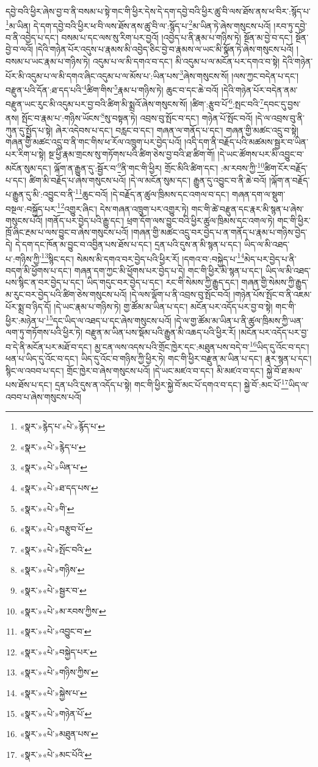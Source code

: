 དབྱེ་བའི་ཕྱིར་ཞེས་བྱ་བ་ནི་བསམ་པ་སྟེ་གང་གི་ཕྱིར་དེས་དེ་དག་དབྱེ་བའི་ཕྱིར་ཚུ་བི་ལས་ཐོས་ནས་ཕ་བིར་:སྙོད་པ་\footnote{«སྣར་»རྙེད་པ་«པེ་»རྙོད་པ་}མ་ཡིན། དེ་དག་དབྱེ་བའི་ཕྱིར་ཕ་བི་ལས་ཐོས་ནས་ཚུ་བི་ལ་:སྙོད་པ་\footnote{«སྣར་»«པེ་»རྙེད་པ་}མ་ཡིན་ཏེ་ཞེས་གསུངས་པའོ། །རབ་ཏུ་དབྱེ་བ་ནི་འབྱེད་པ་དང་། བསམ་པ་དང་ལས་སུ་རིག་པར་བྱའོ། །འབྱེད་པ་ནི་རྣམ་པ་གཉིས་ཏེ། སྔོན་མ་བྱེ་བ་དང་། སྔོན་བྱེ་བ་ལའོ། །དེའི་གཉེན་པོར་འདུས་པ་རྣམས་མི་འབྱེད་ཅིང་བྱེ་བ་རྣམས་ལ་ཡང་མི་སྣོན་ཏེ་ཞེས་གསུངས་པའོ། །བསམ་པ་ཡང་རྣམ་པ་གཉིས་ཏེ། འདུམ་པ་ལ་མི་དགའ་བ་དང་། མི་འདུམ་པ་ལ་མངོན་པར་དགའ་བ་སྟེ། དེའི་གཉེན་པོར་མི་འདུམ་པ་ལ་མི་དགའ་ཞིང་འདུམ་པ་ལ་མོས་པ་:ཡིན་པས་\footnote{«སྣར་»«པེ་»ཡིན་པ་}ཞེས་གསུངས་སོ། །ལས་ཀྱང་བདེན་པ་དང་། བརྫུན་པའི་དོན་:ཐ་དད་པའི་\footnote{«སྣར་»«པེ་»ཐ་དད་པས་}ཚིག་གིས་\footnote{«སྣར་»«པེ་»གི་}རྣམ་པ་གཉིས་ཏེ། ཆུང་བ་དང་ཆེ་བའོ། །དེའི་གཉེན་པོར་བདེན་ནམ་བརྫུན་ཡང་རུང་མི་འདུམ་པར་བྱ་བའི་ཚིག་མི་སྨྲའོ་ཞེས་གསུངས་སོ། །ཚིག་:རྩུབ་པོ་\footnote{«སྣར་»«པེ་»བརྩུབ་པོ་}:སྤང་བའི་\footnote{«སྣར་»«པེ་»སྤོང་བའི་}དབང་དུ་བྱས་ནས། སྤོང་བ་རྣམ་པ་:གཉིས་ཡོངས་\footnote{«སྣར་»«པེ་»གཉིས་}སུ་བསྟན་ཏེ། འབྲས་བུ་སྤོང་བ་དང་། གཉེན་པོ་སྤོང་བའོ། །དེ་ལ་འབྲས་བུ་ནི་ཀུན་དུ་སྤྱོད་པ་སྟེ། ཞེར་འདེབས་པ་དང་། བརླང་བ་དང་། གཞན་ལ་གནོད་པ་དང་། གཞན་གྱི་མཚང་འདྲུ་བ་སྟེ། གཞན་གྱི་མཚང་འདྲུ་བ་ནི་གང་གིས་ཕ་རོལ་འཁྲུག་པར་བྱེད་པའོ། །འདི་དག་ནི་བརྗོད་པའི་མཚམས་སྦྱར་བ་ཡིན་པར་རིག་པ་སྟེ། སྔ་ཕྱི་རྣམ་གྲངས་སུ་གཏོགས་པའི་ཚིག་ཅེས་བྱ་བའི་ཐ་ཚིག་གོ། །དེ་ཡང་ཚོགས་པར་མི་འབྱུང་བ་མངོན་སུམ་དང་། ལྐོག་ན་རྒྱུན་དུ་:སྦྱོར་བ་\footnote{«སྣར་»«པེ་»སྦྱར་བ་}ནི་གང་གི་ཕྱིར། གྲོང་མིའི་ཚིག་དང་། :མ་རབས་ཀྱི་\footnote{«སྣར་»«པེ་»མ་རབས་ཀྱིས་}ཚིག་ངོར་བརྗོད་པ་དང་། ཚིག་མི་བརྗོད་པ་ཞེས་གསུངས་པའོ། །དེ་ལ་མངོན་སུམ་དང་། རྒྱུན་དུ་འབྱུང་བ་ནི་ཆེ་བའོ། །ལྐོག་ན་བརྗོད་པ་རྒྱུན་དུ་མི་:འབྱུང་བ་ནི་\footnote{«སྣར་»«པེ་»འབྱུང་བ་}ཆུང་བའོ། །དེ་བརྗོད་ན་ཚུལ་ཁྲིམས་དང་འགལ་བ་དང་། གཞན་དག་ལ་སྡུག་བསྔལ་:བསྐྱོད་པར་\footnote{«སྣར་»«པེ་»བསྐྱེད་པར་}འགྱུར་ཞིང་། དེས་གཞན་འཁྲུག་པར་འགྱུར་ཏེ། གང་གི་ཚེ་བརྫུན་དང་རྣར་མི་སྙན་པ་ཞེས་གསུངས་པའོ། །གནོད་པར་བྱེད་པའི་རྒྱུ་དང་། ཕྲག་དོག་ལས་བྱུང་བའི་ཕྱིར་ཚུལ་ཁྲིམས་དང་འགལ་ཏེ། གང་གི་ཕྱིར་ཁྲོ་ཞིང་རྔམ་པ་ལས་བྱུང་བ་ཞེས་གསུངས་པའོ། །གཞན་གྱི་མཚང་འདྲུ་བར་བྱེད་པ་ན་གནོད་པ་རྣམ་པ་གཉིས་བྱེད་དེ། དེ་དག་དང་ཁོན་མ་བྱུང་བ་འབྱིན་པས་ཐོས་པ་དང་། དྲན་པའི་དུས་ན་མི་སྙན་པ་དང་། ཡིད་ལ་མི་འཐད་པ་:གཉིས་ཀྱི་\footnote{«སྣར་»«པེ་»གཉིས་ཀྱིས་}སྙིང་དང་། སེམས་མི་དགའ་བར་བྱེད་པའི་ཕྱིར་རོ། །དགའ་བ་:བསྐྱེད་པ་\footnote{«སྣར་»«པེ་»སྐྱེས་པ་}མེད་པར་བྱེད་པ་ནི་བདག་མི་ཕྱོགས་པ་དང་། གཞན་དག་ཀྱང་མི་ཕྱོགས་པར་བྱེད་པ་དེ། གང་གི་ཕྱིར་མི་སྙན་པ་དང་། ཡིད་ལ་མི་འཐད་པས་སྙིང་ན་བར་བྱེད་པ་དང་། ཡིད་གདུང་བར་བྱེད་པ་དང་། རང་གི་སེམས་ཀྱི་རྒྱུད་དང་། གཞན་གྱི་སེམས་ཀྱི་རྒྱུད་མ་རུང་བར་བྱེད་པའི་ཚིག་ཅེས་གསུངས་པའོ། །དེ་ལས་ལྡོག་པ་ནི་འབྲས་བུ་སྤོང་བའོ། །གཉེན་པོས་སྤོང་བ་ནི་འཇམ་པོར་སྨྲ་བ་ཉིད་དོ། །དེ་ཡང་རྣམ་པ་གཉིས་ཏེ། གྱ་ཚོམ་མ་ཡིན་པ་དང་། མངོན་པར་འདོད་པར་བྱ་བ་སྟེ། གང་གི་ཕྱིར་:མཉེན་པ་\footnote{«སྣར་»«པེ་»གཉེན་པོ་}དང་ཡིད་ལ་འཐད་པ་དང་ཞེས་གསུངས་པའོ། །དེ་ལ་གྱ་ཚོམ་མ་ཡིན་པ་ནི་ཚུལ་ཁྲིམས་ཀྱི་ཡན་ལག་ཏུ་གཏོགས་པའི་ཕྱིར་ཏེ། བརྫུན་མ་ཡིན་པས་སྡོམ་པའི་རྒྱུན་མི་འཆད་པའི་ཕྱིར་རོ། །མངོན་པར་འདོད་པར་བྱ་བ་དེ་ནི་མངོན་པར་མཐོ་བ་དང་། མྱ་ངན་ལས་འདས་པའི་གྲོང་ཁྱེར་དང་:མཐུན་པས་བདེ་བ་\footnote{«སྣར་»«པེ་»མཐུན་པས་}ཡིད་དུ་འོང་བ་དང་། ཕན་པ་ཡིད་དུ་འོང་བ་དང་། ཡིད་དུ་འོང་བ་གཉིས་ཀྱི་ཕྱིར་ཏེ། གང་གི་ཕྱིར་བརྫུན་མ་ཡིན་པ་དང་། རྣར་སྙན་པ་དང་། སྙིང་ལ་འབབ་པ་དང་། གྲོང་ཁྱེར་བ་ཞེས་གསུངས་པའོ། །དེ་ཡང་མཛའ་བ་དང་། མི་མཛའ་བ་དང་། སྐྱེ་བོ་ཐ་མལ་པས་ཐོས་པ་དང་། དྲན་པའི་དུས་ན་འདོད་པ་སྟེ། གང་གི་ཕྱིར་སྐྱེ་བོ་མང་པོ་དགའ་བ་དང་། སྐྱེ་བོ་:མང་པོ་\footnote{«སྣར་»«པེ་»མང་པོའི་}ཡིད་ལ་འབབ་པ་ཞེས་གསུངས་པའོ། 